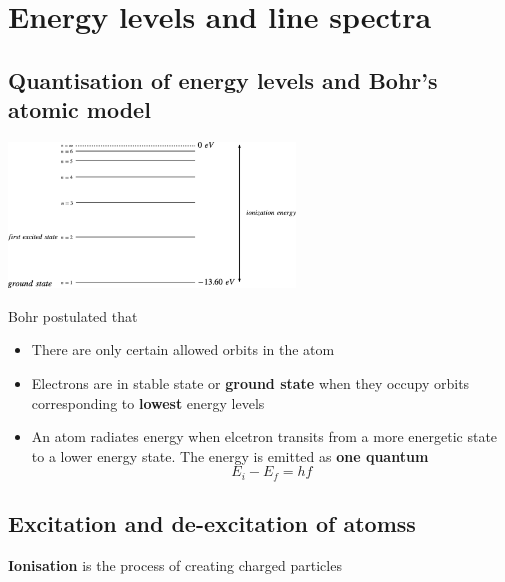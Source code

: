 \documentclass[a4paper, 10pt]{article}
\begin{document}
\section{Energy levels and line spectra}

\subsection{Quantisation of energy levels and Bohr's atomic model}

\begin{minipage}{0.5\textwidth}
   \begin{center}
      \includegraphics[width=3in]{figures/7.pdf} 
   \end{center}	
\end{minipage}
\begin{minipage}{0.5\textwidth}
   Bohr postulated that
   \begin{itemize}
      \item There are only certain allowed orbits in the atom
      \item Electrons are in stable state or \textbf{ground state} when they occupy orbits corresponding to \textbf{lowest} energy levels
      \item An atom radiates energy when elcetron transits from a more energetic state to a lower energy state. The energy is emitted as \textbf{one quantum} 
         \[
         E_i - E_f = hf
         \]
         
   \end{itemize}	
\end{minipage}

\subsection{Excitation and de-excitation of atomss}

\textbf{Ionisation} is the process of creating charged particles \\
\end{document}
